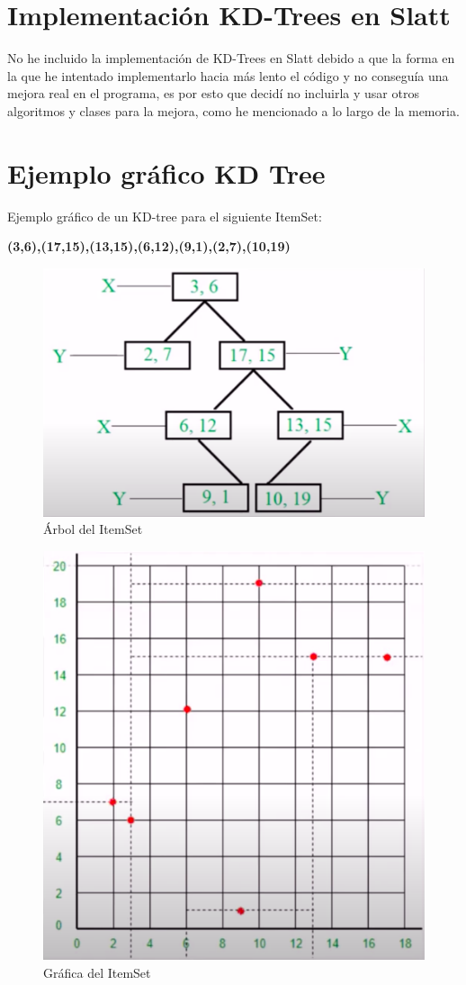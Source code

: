 \documentclass{cosas/tfg_domingo}
\begin{document}
\section{Implementación KD-Trees en Slatt}

No he incluido la implementación de KD-Trees en Slatt debido a que la forma en la que he intentado implementarlo hacia más lento el código y no conseguía una mejora real en el programa, es por esto que decidí no incluirla y usar otros algoritmos y clases para la mejora, como he mencionado a lo largo de la memoria.

\newpage
\section{Ejemplo gráfico KD Tree}

\hfill

Ejemplo gráfico de un KD-tree para el siguiente ItemSet:

\textbf{{(3,6),(17,15),(13,15),(6,12),(9,1),(2,7),(10,19)}}

\hfill

\begin{figure}[h]
\begin{center}
\includegraphics[width=.4\linewidth]{imagenes/kdtree1.png}
\end{center}
\caption{Árbol del ItemSet}
\label{arbol_kd}
\end{figure}

\begin{figure}[h]
\begin{center}
\includegraphics[width=.4\linewidth]{imagenes/kdtree2.png}
\end{center}
\caption{Gráfica del ItemSet}
\label{grafica_kd}
\end{figure}
\end{document}
